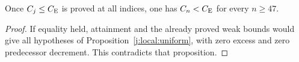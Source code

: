 \begin{corollary}
\label{j:local:equality}
Once $C_j\le C_{\mathrm E}$ is proved at all indices, one has $C_n<C_{\mathrm E}$ for every $n\ge47$.
\end{corollary}
\begin{proof}
If equality held, attainment and the already proved weak bounds would
give all hypotheses of Proposition~\ref{j:local:uniform}, with zero
excess and zero predecessor decrement. This contradicts that proposition.
\end{proof}
